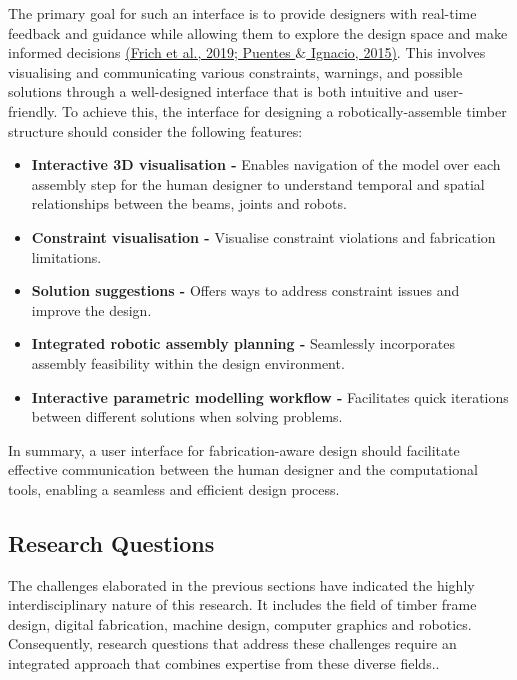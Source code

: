 \documentclass[11pt]{book}
\begin{document}
The primary goal for such an interface is to provide designers with real-time feedback and guidance while allowing them to explore the design space and make informed decisions \href{https://www.zotero.org/google-docs/?5BPzBQ}{(Frich et al., 2019; Puentes $\&$ Ignacio, 2015)}. This involves visualising and communicating various constraints, warnings, and possible solutions through a well-designed interface that is both intuitive and user-friendly. To achieve this, the interface for designing a robotically-assemble timber structure should consider the following features: 

\begin{itemize}
	\item \textbf{Interactive 3D visualisation - }Enables navigation of the model over each assembly step for the human designer to understand temporal and spatial relationships between the beams, joints and robots.

	\item \textbf{Constraint visualisation - }Visualise constraint violations and fabrication limitations. 

	\item \textbf{Solution suggestions - }Offers ways to address constraint issues and improve the design.

	\item \textbf{Integrated robotic assembly planning -} Seamlessly incorporates assembly feasibility within the design environment.

	\item \textbf{Interactive parametric modelling workflow - }Facilitates quick iterations between different solutions when solving problems.

\end{itemize}
In summary, a user interface for fabrication-aware design should facilitate effective communication between the human designer and the computational tools, enabling a seamless and efficient design process. 

\subsection{Research Questions}

The challenges elaborated in the previous sections have indicated the highly interdisciplinary nature of this research. It includes the field of timber frame design, digital fabrication, machine design, computer graphics and robotics. Consequently, research questions that address these challenges require an integrated approach that combines expertise from these diverse fields..
\end{document}
